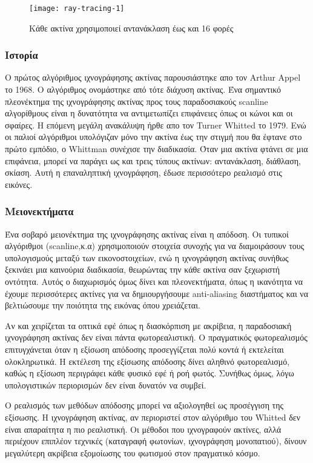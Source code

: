 \begin{figure}[h]
\centering
\texttt{[image: ray-tracing-1]}
\caption{Κάθε ακτίνα χρησιμοποιεί αντανάκλαση έως και 16 φορές\cite{figure-15}}
\end{figure}

\subsubsection{Ιστορία}
Ο πρώτος αλγόριθμος ιχνογράφησης ακτίνας παρουσιάστηκε απο τον Arthur Appel το 1968. Ο αλγόριθμος ονομάστηκε από τότε διάχυση ακτίνας. Ένα σημαντικό πλεονέκτημα της ιχνογράφησης ακτίνας προς τους παραδοσιακούς scanline αλγορίθμους είναι η δυνατότητα να αντιμετωπίζει επιφάνειες όπως οι κώνοι και οι σφαίρες. Η επόμενη μεγάλη ανακάλυψη ήρθε απο τον Turner Whitted το 1979. Ενώ οι παλιοί αλγόριθμοι υπολόγιζαν μόνο την ακτίνα έως την στιγμή που θα έφτανε στο πρώτο εμπόδιο, ο Whittman συνέχισε την διαδικασία. Όταν μια ακτίνα φτάνει σε μια επιφάνεια, μπορεί να παράγει ως και τρεις τύπους ακτίνων: αντανάκλαση, διάθλαση, σκίαση. Αυτή η επαναληπτική ιχνογράφηση, έδωσε περισσότερο ρεαλισμό στις εικόνες.

\subsubsection{Μειονεκτήματα}
Ένα σοβαρό μειονέκτημα της ιχνογράφησης ακτίνας είναι η απόδοση. Οι τυπικοί αλγόριθμοι (scanline,κ.α) χρησιμοποιούν στοιχεία συνοχής για να διαμοιράσουν τους υπολογισμούς μεταξύ των εικονοστοιχείων, ενώ η ιχνογράφηση ακτίνας συνήθως ξεκινάει μια καινούρια διαδικασία, θεωρώντας την κάθε ακτίνα σαν ξεχωριστή οντότητα. Αυτός ο διαχωρισμός όμως δίνει και πλεονεκτήματα, όπως η ικανότητα να έχουμε περισσότερες ακτίνες για να δημιουργήσουμε anti-aliasing διαστήματος και να βελτιώσουμε την ποιότητα της εικόνας όπου χρειάζεται.

Αν και χειρίζεται τα οπτικά εφέ όπως η διασκόρπιση με ακρίβεια, η παραδοσιακή ιχνογράφηση ακτίνας δεν είναι πάντα φωτορεαλιστική. Ο πραγματικός φωτορεαλισμός επιτυγχάνεται όταν η εξίσωση απόδοσης προσεγγίζεται πολύ κοντά ή εκτελείται ολοκληρωτικά. Η εκτέλεση της εξίσωσης απόδοσης δίνει αληθινό φωτορεαλισμό, καθώς η εξίσωση περιγράφει κάθε φυσικό εφέ ή ροή φωτός. Συνήθως όμως, λόγω υπολογιστικών περιορισμών δεν είναι δυνατόν να συμβεί.

Ο ρεαλισμός των μεθόδων απόδοσης μπορεί να αξιολογηθεί ως προσέγγιση της εξίσωσης. Η ιχνογράφηση ακτίνας, αν περιοριστεί στον αλγόριθμο του Whitted δεν είναι απαραίτητα η πιο ρεαλιστική. Οι μέθοδοι που ιχνογραφούν ακτίνες, αλλά περιέχουν επιπλέον τεχνικές (καταγραφή φωτονίων, ιχνογράφηση μονοπατιού), δίνουν μεγαλύτερη ακρίβεια εξομοίωσης του φωτισμού στον πραγματικό κόσμο.

